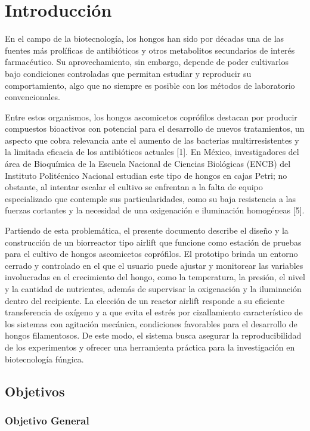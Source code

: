 \chapter{Introducción}\label{cap1}
En el campo de la biotecnología, los hongos han sido por décadas una de las fuentes más prolíficas de antibióticos y otros metabolitos secundarios de interés farmacéutico. Su aprovechamiento, sin embargo, depende de poder cultivarlos bajo condiciones controladas que permitan estudiar y reproducir su comportamiento, algo que no siempre es posible con los métodos de laboratorio convencionales.

Entre estos organismos, los hongos ascomicetos coprófilos destacan por producir compuestos bioactivos con potencial para el desarrollo de nuevos tratamientos, un aspecto que cobra relevancia ante el aumento de las bacterias multirresistentes y la limitada eficacia de los antibióticos actuales [1]. En México, investigadores del área de Bioquímica de la Escuela Nacional de Ciencias Biológicas (ENCB) del Instituto Politécnico Nacional estudian este tipo de hongos en cajas Petri; no obstante, al intentar escalar el cultivo se enfrentan a la falta de equipo especializado que contemple sus particularidades, como su baja resistencia a las fuerzas cortantes y la necesidad de una oxigenación e iluminación homogéneas [5].

Partiendo de esta problemática, el presente documento describe el diseño y la construcción de un biorreactor tipo airlift que funcione como estación de pruebas para el cultivo de hongos ascomicetos coprófilos. El prototipo brinda un entorno cerrado y controlado en el que el usuario puede ajustar y monitorear las variables involucradas en el crecimiento del hongo, como la temperatura, la presión, el nivel y la cantidad de nutrientes, además de supervisar la oxigenación y la iluminación dentro del recipiente. La elección de un reactor airlift responde a su eficiente transferencia de oxígeno y a que evita el estrés por cizallamiento característico de los sistemas con agitación mecánica, condiciones favorables para el desarrollo de hongos filamentosos. De este modo, el sistema busca asegurar la reproducibilidad de los experimentos y ofrecer una herramienta práctica para la investigación en biotecnología fúngica.


\section{Objetivos}

\subsection{Objetivo General}

